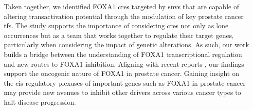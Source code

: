 Taken together, we identified FOXA1 \glspl{cre} targeted by \glspl{snv} that are capable of altering transactivation potential through the modulation of key prostate cancer \glspl{tf}.
The study supports the importance of considering \glspl{cre} not only as lone occurrences but as a team that works together to regulate their target genes, particularly when considering the impact of genetic alterations.
As such, our work builds a bridge between the understanding of FOXA1 transcriptional regulation and new routes to FOXA1 inhibition.
Aligning with recent reports \cite{paroliaDistinctStructuralClasses2019,adamsFOXA1MutationsAlter2019,gaoForkheadDomainMutations2019}, our findings support the oncogenic nature of FOXA1 in prostate cancer.
Gaining insight on the cis-regulatory plexuses of important genes such as FOXA1 in prostate cancer may provide new avenues to inhibit other drivers across various cancer types to halt disease progression.
